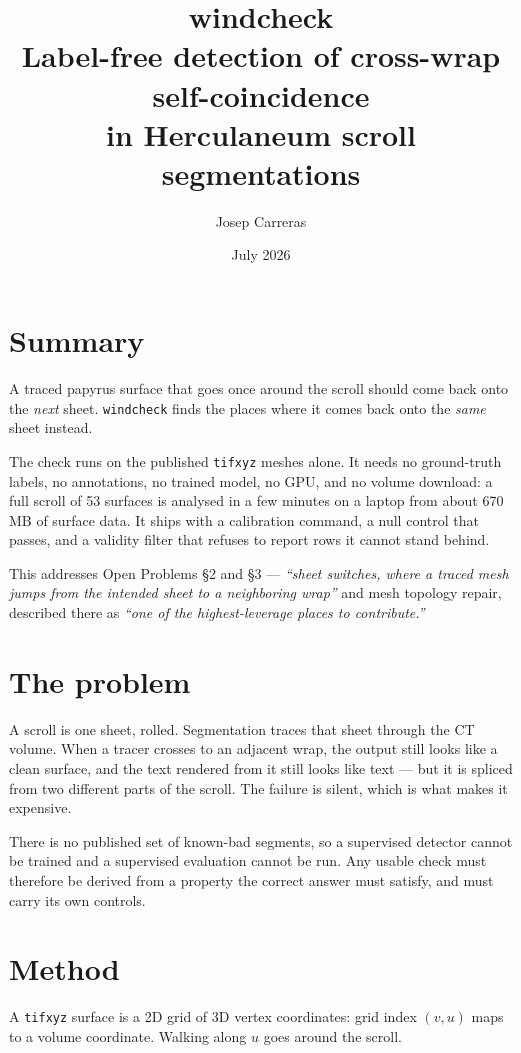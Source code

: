 \documentclass[11pt,a4paper]{article}
\title{\vspace{-1.4cm}\textbf{windcheck}\\[0.25em]
\large Label-free detection of cross-wrap self-coincidence\\
in Herculaneum scroll segmentations}
\author{Josep Carreras}
\date{July 2026}
\begin{document}
\maketitle
\vspace{-0.9em}

\section*{Summary}

A traced papyrus surface that goes once around the scroll should come back onto
the \emph{next} sheet. \texttt{windcheck} finds the places where it comes back
onto the \emph{same} sheet instead.

The check runs on the published \texttt{tifxyz} meshes alone. It needs no
ground-truth labels, no annotations, no trained model, no GPU, and no volume
download: a full scroll of 53 surfaces is analysed in a few minutes on a laptop
from about 670\,MB of surface data. It ships with a calibration command, a null
control that passes, and a validity filter that refuses to report rows it cannot
stand behind.

This addresses Open Problems \S2 and \S3 --- \emph{``sheet switches, where a
traced mesh jumps from the intended sheet to a neighboring wrap''} and mesh
topology repair, described there as \emph{``one of the highest-leverage places
to contribute.''}

\section{The problem}

A scroll is one sheet, rolled. Segmentation traces that sheet through the CT
volume. When a tracer crosses to an adjacent wrap, the output still looks like a
clean surface, and the text rendered from it still looks like text --- but it is
spliced from two different parts of the scroll. The failure is silent, which is
what makes it expensive.

There is no published set of known-bad segments, so a supervised detector cannot
be trained and a supervised evaluation cannot be run. Any usable check must
therefore be derived from a property the correct answer must satisfy, and must
carry its own controls.

\section{Method}

A \texttt{tifxyz} surface is a 2D grid of 3D vertex coordinates: grid index
$(v,u)$ maps to a volume coordinate. Walking along $u$ goes around the scroll.
\end{document}
